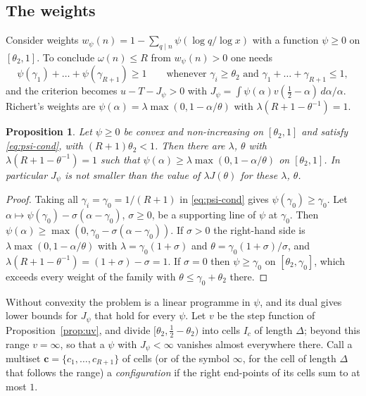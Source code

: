 \documentclass[11pt,a4paper]{amsart}
\newtheorem{proposition}[theorem]{Proposition}
\theoremstyle{remark}
\numberwithin{equation}{section}
\begin{document}
\subsection{The weights}
Consider weights $w_\psi(n)=1-\sum_{q\mid n}\psi(\log q/\log x)$ with a function $\psi\ge0$ on $[\theta_2,1]$. To
conclude $\omega(n)\le R$ from $w_\psi(n)>0$ one needs
\begin{equation}\label{eq:psi-cond}
\psi(\gamma_1)+\dots+\psi(\gamma_{R+1})\ge1\qquad\text{whenever }\gamma_i\ge\theta_2\text{ and }\gamma_1+\dots+\gamma_{R+1}\le1,
\end{equation}
and the criterion becomes $u-T-J_\psi>0$ with $J_\psi=\int\psi(\alpha)v(\frac12-\alpha)\,d\alpha/\alpha$.
Richert's weights are $\psi(\alpha)=\lambda\max(0,1-\alpha/\theta)$ with $\lambda(R+1-\theta^{-1})=1$.

\begin{proposition}\label{prop:richert}
Let $\psi\ge0$ be convex and non-increasing on $[\theta_2,1]$ and satisfy \eqref{eq:psi-cond}, with
$(R+1)\theta_2<1$. Then there are $\lambda$, $\theta$ with $\lambda(R+1-\theta^{-1})=1$ such that
$\psi(\alpha)\ge\lambda\max(0,1-\alpha/\theta)$ on $[\theta_2,1]$. In particular $J_\psi$ is not smaller than the
value of $\lambda J(\theta)$ for these $\lambda$, $\theta$.
\end{proposition}
\begin{proof}
Taking all $\gamma_i=\gamma_0=1/(R+1)$ in \eqref{eq:psi-cond} gives $\psi(\gamma_0)\ge\gamma_0$. Let
$\alpha\mapsto\psi(\gamma_0)-\sigma(\alpha-\gamma_0)$, $\sigma\ge0$, be a supporting line of $\psi$ at $\gamma_0$.
Then $\psi(\alpha)\ge\max(0,\gamma_0-\sigma(\alpha-\gamma_0))$. If $\sigma>0$ the right-hand side is
$\lambda\max(0,1-\alpha/\theta)$ with $\lambda=\gamma_0(1+\sigma)$ and $\theta=\gamma_0(1+\sigma)/\sigma$, and
$\lambda(R+1-\theta^{-1})=(1+\sigma)-\sigma=1$. If $\sigma=0$ then $\psi\ge\gamma_0$ on $[\theta_2,\gamma_0]$,
which exceeds every weight of the family with $\theta\le\gamma_0+\theta_2$ there.
\end{proof}
Without convexity the problem is a linear programme in $\psi$, and its dual gives lower bounds for $J_\psi$ that
hold for every $\psi$. Let $v$ be the step function of Proposition~\ref{prop:uv}, and divide
$[\theta_2,\frac12-\theta_2)$ into cells $I_c$ of length $\Delta$; beyond this range $v=\infty$, so that a $\psi$ with
$J_\psi<\infty$ vanishes almost everywhere there. Call a multiset $\mathbf c=\{c_1,\dots,c_{R+1}\}$ of cells (or of
the symbol $\infty$, for the cell of length $\Delta$ that follows the range) a \emph{configuration} if the right end-points of its
cells sum to at most $1$.
\end{document}
